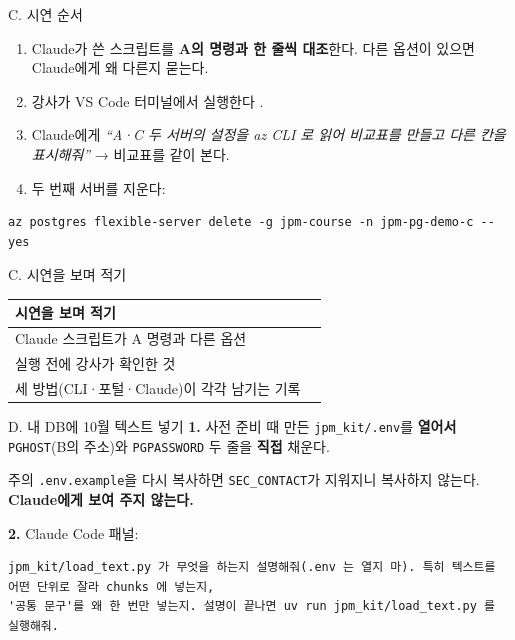 \begin{frame}[fragile]{C. 시연 순서}
\small
\begin{enumerate}
\item Claude가 쓴 스크립트를 \textbf{A의 명령과 한 줄씩 대조}한다. 다른 옵션이 있으면 Claude에게 왜 다른지 묻는다.
\item 강사가 VS Code 터미널에서 실행한다 .
\item Claude에게 \textit{``A·C 두 서버의 설정을 az CLI 로 읽어 비교표를 만들고 다른 칸을 표시해줘''} → 비교표를 같이 본다.
\item 두 번째 서버를 지운다:
\end{enumerate}
\begin{Verbatim}
az postgres flexible-server delete -g jpm-course -n jpm-pg-demo-c --yes
\end{Verbatim}
\end{frame}

\begin{frame}{C. 시연을 보며 적기}
\begin{tabularx}{\textwidth}{@{}>{\raggedright\arraybackslash}p{6.4cm} X@{}}
\toprule
\textbf{시연을 보며 적기} & \\
\midrule
Claude 스크립트가 A 명령과 다른 옵션 & \\[14pt]
실행 전에 강사가 확인한 것 & \\[14pt]
세 방법(CLI·포털·Claude)이 각각 남기는 기록 & \\[14pt]
\bottomrule
\end{tabularx}
\end{frame}

\begin{frame}[fragile]{D. 내 DB에 10월 텍스트 넣기}
\small
\textbf{1.} 사전 준비 때 만든 \texttt{jpm\_kit/.env}를 \textbf{열어서} \texttt{PGHOST}(B의 주소)와 \texttt{PGPASSWORD} 두 줄을 \textbf{직접} 채운다.
\begin{alertblock}{주의}
\texttt{.env.example}을 다시 복사하면 \texttt{SEC\_CONTACT}가 지워지니 복사하지 않는다. \textbf{Claude에게 보여 주지 않는다.}
\end{alertblock}
\vspace{0.2em}
\textbf{2.} Claude Code 패널:
\begin{Verbatim}
jpm_kit/load_text.py 가 무엇을 하는지 설명해줘(.env 는 열지 마). 특히 텍스트를 어떤 단위로 잘라 chunks 에 넣는지,
'공통 문구'를 왜 한 번만 넣는지. 설명이 끝나면 uv run jpm_kit/load_text.py 를 실행해줘.
\end{Verbatim}
\end{frame}

